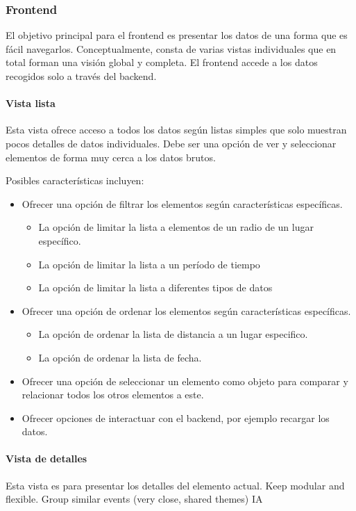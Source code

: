 \subsubsection{Frontend}

El objetivo principal para el frontend es presentar los datos de una forma que es fácil navegarlos. Conceptualmente, consta de varias vistas individuales que en total forman una visión global y completa.
El frontend accede a los datos recogidos solo a través del backend.

\paragraph{Vista lista} Esta vista ofrece acceso a todos los datos según listas simples que solo muestran pocos detalles de datos individuales.
Debe ser una opción de ver y seleccionar elementos de forma muy cerca a los datos brutos.

Posibles características incluyen:
\begin{itemize}
    \item[Filtros] Ofrecer una opción de filtrar los elementos según características específicas.
    \begin{itemize}
        \item[Lugar] La opción de limitar la lista a elementos de un radio de un lugar específico.
        \item[Fecha] La opción de limitar la lista a un período de tiempo
        \item[Tipo] La opción de limitar la lista a diferentes tipos de datos
    \end{itemize}
    \item[Orden] Ofrecer una opción de ordenar los elementos según características específicas.
    \begin{itemize}
        \item[Lugar] La opción de ordenar la lista de distancia a un lugar especifico.
        \item[Fecha] La opción de ordenar la lista de fecha.
    \end{itemize}
    \item[Comparar] Ofrecer una opción de seleccionar un elemento como objeto para comparar y relacionar todos los otros elementos a este.
    \item[Datos] Ofrecer opciones de interactuar con el backend, por ejemplo recargar los datos.
\end{itemize}

\paragraph{Vista de detalles} Esta vista es para presentar los detalles del elemento actual.
Keep modular and flexible.
Group similar events (very close, shared themes)
IA

